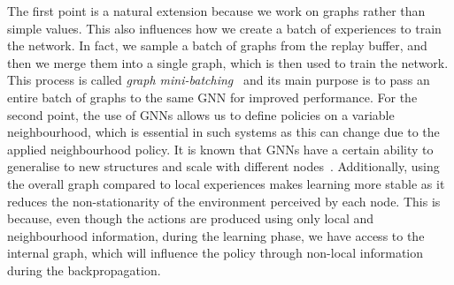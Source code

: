 \documentclass[conference]{IEEEtran}
\begin{document}
The first point is a natural extension because we work on graphs rather than simple values.
This also influences how we create a batch of experiences to train the network.
 In fact, we sample a batch of graphs from the replay buffer,
 and then we merge them into a single graph,
 which is then used to train the network.
 This process is called \emph{graph mini-batching}~\cite{DBLP:journals/corr/abs-1903-02428,wang2019deep}
 and its main purpose is to pass an entire batch of graphs to the same \ac{GNN} for improved performance.
%
For the second point,
 the use of \acp{GNN} allows us to define policies on a variable neighbourhood, which is essential in such systems as this can change due to the applied neighbourhood policy.
 It is known that \acp{GNN} have a certain ability to generalise to new structures and scale with different nodes~\cite{DBLP:journals/aiopen/ZhouCHZYLWLS20,DBLP:conf/nips/KnyazevTA19}. 
% 
Additionally, 
 using the overall graph compared to local experiences makes learning more stable as it reduces the non-stationarity of the environment perceived by each node.
% 
This is because, even though the actions are produced using only local and neighbourhood information, 
 during the learning phase, we have access to the internal graph, 
 which will influence the policy through non-local information 
 during the backpropagation.
%
\end{document}
